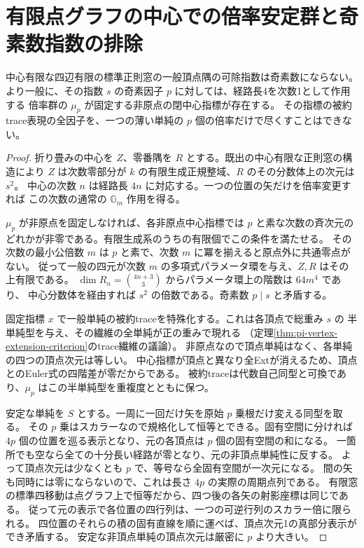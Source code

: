 \section{有限点グラフの中心での倍率安定群と奇素数指数の排除}
\label{sec:odd-prime-finite-indices}
\begin{theorem}\label{thm:odd-prime-finite-indices}
中心有限な四辺有限の標準正則窓の一般頂点隅の可除指数は奇素数にならない。
より一般に、その指数 $s$ の奇素因子 $p$ に対しては、経路長4を次数1として作用する
倍率群の $\mu_p$ が固定する非原点の閉中心指標が存在する。
その指標の被約trace表現の全因子を、一つの薄い単純の $p$ 個の倍率だけで尽くすことはできない。
\end{theorem}
\begin{proof}
折り畳みの中心を $Z$、零番隅を $R$ とする。既出の中心有限な正則窓の構造により
$Z$ は次数零部分が $k$ の有限生成正規整域、$R$ のその分数体上の次元は $s^2$。
中心の次数 $n$ は経路長 $4n$ に対応する。一つの位置の矢だけを倍率変更すれば
この次数の通常の $\mathbb G_m$ 作用を得る。

$\mu_p$ が非原点を固定しなければ、各非原点中心指標では $p$ と素な次数の斉次元の
どれかが非零である。有限生成系のうちの有限個でこの条件を満たせる。
その次数の最小公倍数 $m$ は $p$ と素で、次数 $m$ に冪を揃えると原点外に共通零点がない。
従って一般の四元が次数 $m$ の多項式パラメータ環を与え、$Z,R$ はその上有限である。
$\dim R_n=\binom{4n+3}3$ からパラメータ環上の階数は $64m^4$ であり、
中心分数体を経由すれば $s^2$ の倍数である。奇素数 $p\mid s$ と矛盾する。

固定指標 $x$ で一般単純の被約traceを特殊化する。これは各頂点で総重み $s$ の
半単純型を与え、その繊維の全単純が正の重みで現れる
（定理\ref{thm:pi-vertex-extension-criterion}のtrace繊維の議論）。
非原点なので頂点単純はなく、各単純の四つの頂点次元は等しい。
中心指標が頂点と異なり全Extが消えるため、頂点とのEuler式の四階差が零だからである。
被約traceは代数自己同型と可換であり、$\mu_p$ はこの半単純型を重複度とともに保つ。

安定な単純を $S$ とする。一周に一回だけ矢を原始 $p$ 乗根だけ変える同型を取る。
その $p$ 乗はスカラーなので規格化して恒等とできる。固有空間に分ければ
$4p$ 個の位置を巡る表示となり、元の各頂点は $p$ 個の固有空間の和になる。
一箇所でも空なら全ての十分長い経路が零となり、元の非頂点単純性に反する。
よって頂点次元は少なくとも $p$ で、等号なら全固有空間が一次元になる。
間の矢も同時には零にならないので、これは長さ $4p$ の実際の周期点列である。
有限窓の標準四移動は点グラフ上で恒等だから、四つ後の各矢の射影座標は同じである。
従って元の表示で各位置の四行列は、一つの可逆行列のスカラー倍に限られる。
四位置のそれらの積の固有直線を順に運べば、頂点次元1の真部分表示ができ矛盾する。
安定な非頂点単純の頂点次元は厳密に $p$ より大きい。


\end{proof}
